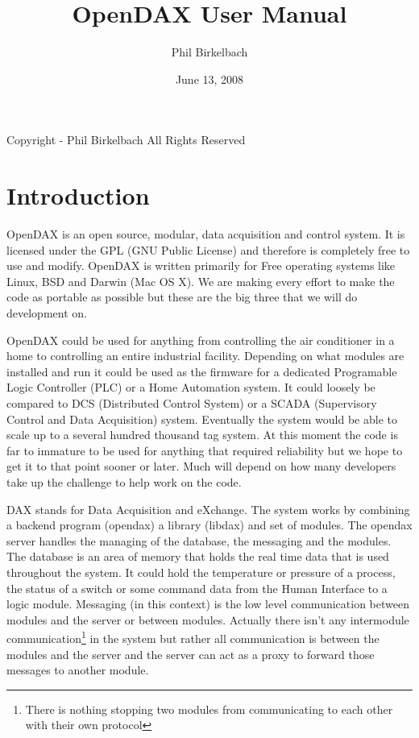 \documentclass[letterpaper,10pt]{book}
\title{OpenDAX User Manual}
\date{June 13, 2008}
\author{Phil Birkelbach}
\begin{document}
\begin{titlepage}
\maketitle

\begin{flushleft}
Copyright  - Phil Birkelbach\linebreak
All Rights Reserved
\end{flushleft}

\end{titlepage}
\chapter*{Introduction}
OpenDAX is an open source, modular, data acquisition and control system. It is licensed under the GPL (GNU Public License) and therefore is completely free to use and modify. OpenDAX is written primarily for Free operating systems like Linux, BSD and Darwin (Mac OS X). We are making every effort to make the code as portable as possible but these are the big three that we will do development on.

OpenDAX could be used for anything from controlling the air conditioner in a home to controlling an entire industrial facility. Depending on what modules are installed and run it could be used as the firmware for a dedicated Programable Logic Controller (PLC) or a Home Automation system. It could loosely be compared to DCS (Distributed Control System) or a SCADA (Supervisory Control and Data Acquisition) system. Eventually the system would be able to scale up to a several hundred thousand tag system. At this moment the code is far to immature to be used for anything that required reliability but we hope to get it to that point sooner or later. Much will depend on how many developers take up the challenge to help work on the code.

DAX stands for Data Acquisition and eXchange. The system works by combining a backend program (opendax) a library (libdax) and set of modules. The opendax server handles the managing of the database, the messaging and the modules.  The database is an area of memory that holds the real time data that is used throughout the system.  It could hold the temperature or pressure of a process, the status of a switch or some command data from the Human Interface to a logic module.  Messaging (in this context) is the low level communication between modules and the server or between modules.  Actually there isn't any intermodule communication\footnote{There is nothing stopping two modules from communicating to each other with their own protocol} in the system but rather all communication is between the modules and the server and the server can act as a proxy to forward those messages to another module.
\end{document}
